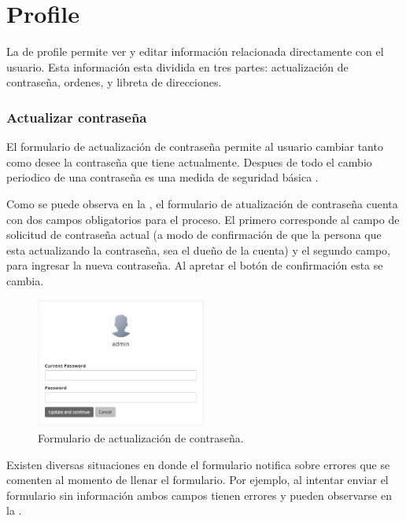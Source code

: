 \section{Profile}

La \uiSiglaAS de profile permite ver y editar información relacionada directamente con el usuario. Esta información esta dividida en tres partes: actualización de contraseña, ordenes, y libreta de direcciones.

\subsubsection{Actualizar contraseña}

El formulario de actualización de contraseña permite al usuario cambiar tanto como desee la contraseña que tiene actualmente. Despues de todo el cambio periodico de una contraseña es una medida de seguridad básica \cite{zviran1999password}.

Como se puede observa en la , el formulario de atualización de contraseña cuenta con dos campos obligatorios para el proceso. El primero corresponde al campo de solicitud de contraseña actual (a modo de confirmación de que la persona que esta actualizando la contraseña, sea el dueño de la cuenta) y el segundo campo, para ingresar la nueva contraseña. Al apretar el botón de confirmación esta se cambia.

\begin{figure}[H]
	\centering
	\includegraphics[width=0.5\textwidth]{figuras/profile/form_update_password.png}

	\caption{Formulario de actualización de contraseña.}
	\label{figure:profile:form:form_update_password}
\end{figure}

Existen diversas situaciones en donde el formulario notifica sobre errores que se comenten  al momento de llenar el formulario. Por ejemplo, al intentar enviar el formulario sin información ambos campos tienen errores y pueden observarse en la .



